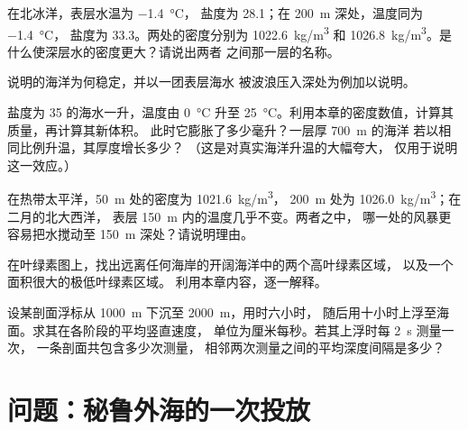 \begin{exercise}[$\star\star$]\label{exo:g10:layered-ocean:10}
在北冰洋，表层水温为 \qty{-1.4}{\degreeCelsius}，
盐度为 28.1；在 \qty{200}{m} 深处，温度同为 \qty{-1.4}{\degreeCelsius}，
盐度为 33.3。两处的密度分别为 \qty{1022.6}{kg/m^3} 和
\qty{1026.8}{kg/m^3}。是什么使深层水的密度更大？请说出两者
之间那一层的名称。
\end{exercise}

\begin{exercise}[$\star\star$]\label{exo:g10:layered-ocean:11}
说明的海洋为何稳定，并以一团表层海水
被波浪压入深处为例加以说明。
\end{exercise}

\begin{exercise}[$\star\star\star$]\label{exo:g10:layered-ocean:12}
盐度为 35 的海水一升，温度由 \qty{0}{\degreeCelsius} 升至
\qty{25}{\degreeCelsius}。利用本章的密度数值，计算其质量，再计算其新体积。
此时它膨胀了多少毫升？一层厚 \qty{700}{m} 的海洋
若以相同比例升温，其厚度增长多少？
（这是对真实海洋升温的大幅夸大，
仅用于说明这一效应。）
\end{exercise}

\begin{exercise}[$\star\star\star$]\label{exo:g10:layered-ocean:13}
在热带太平洋，\qty{50}{m} 处的密度为 \qty{1021.6}{kg/m^3}，
\qty{200}{m} 处为 \qty{1026.0}{kg/m^3}；在二月的北大西洋，
表层 \qty{150}{m} 内的温度几乎不变。两者之中，
哪一处的风暴更容易把水搅动至 \qty{150}{m} 深处？请说明理由。
\end{exercise}

\begin{exercise}[$\star\star\star$]\label{exo:g10:layered-ocean:14}
在叶绿素图上，找出远离任何海岸的开阔海洋中的两个高叶绿素区域，
以及一个面积很大的极低叶绿素区域。
利用本章内容，逐一解释。
\end{exercise}

\begin{exercise}[$\star\star\star$]\label{exo:g10:layered-ocean:15}
设某剖面浮标从 \qty{1000}{m} 下沉至 \qty{2000}{m}，用时六小时，
随后用十小时上浮至海面。求其在各阶段的平均竖直速度，
单位为厘米每秒。若其上浮时每 \qty{2}{s} 测量一次，
一条剖面共包含多少次测量，
相邻两次测量之间的平均深度间隔是多少？
\end{exercise}

\section{问题：秘鲁外海的一次投放}

